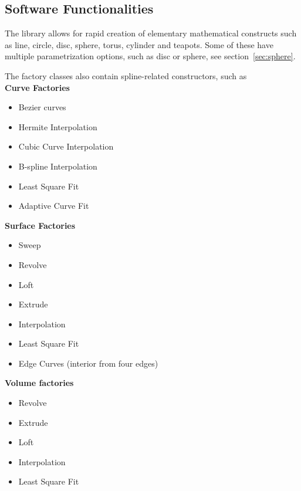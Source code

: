 \documentclass[preprint,12pt, a4paper]{elsarticle}
\begin{document}
\subsection{Software Functionalities}
\label{sec:functionality}

The library allows for rapid creation of elementary mathematical constructs such as line, circle, disc, sphere, torus, cylinder and teapots.
Some of these have multiple parametrization options, such as disc or sphere, see section~\ref{sec:sphere}.

The factory classes also contain spline-related constructors, such as \\
\textbf{Curve Factories}
\begin{itemize}
    \setlength\itemsep{-.5em}
    \item Bezier curves
    \item Hermite Interpolation
    \item Cubic Curve Interpolation
    \item B-spline Interpolation
    \item Least Square Fit
    \item Adaptive Curve Fit
\end{itemize}
\textbf{Surface Factories}
\begin{itemize}
    \setlength\itemsep{-.5em}
    \item Sweep
    \item Revolve
    \item Loft
    \item Extrude
    \item Interpolation
    \item Least Square Fit
    \item Edge Curves (interior from four edges)
\end{itemize}
\textbf{Volume factories}
\begin{itemize}
    \setlength\itemsep{-.5em}
    \item Revolve
    \item Extrude
    \item Loft
    \item Interpolation
    \item Least Square Fit
\end{itemize}
\end{document}
